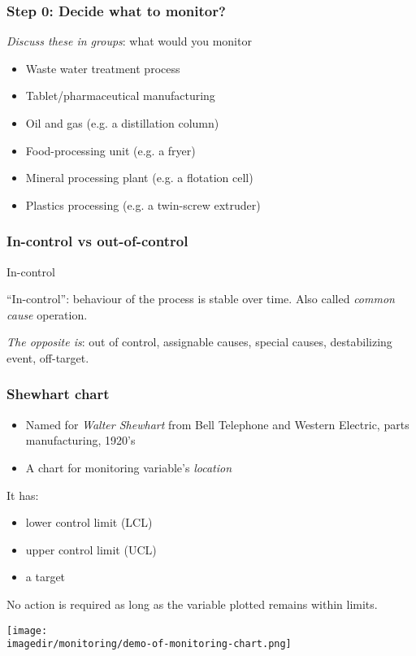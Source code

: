 \begin{frame}\frametitle{Step 0: Decide what to monitor?}
	
	\emph{Discuss these in groups}: what would you monitor 
	\begin{itemize}
		\item	Waste water treatment process 
		\item	Tablet/pharmaceutical manufacturing 
		\item	Oil and gas (e.g. a distillation column) 
		\item	Food-processing unit (e.g. a fryer) 
		\item	Mineral processing plant (e.g. a flotation cell) 
		\item	Plastics processing (e.g. a twin-screw extruder) 
	\end{itemize}
\end{frame}

\begin{frame}\frametitle{In-control vs out-of-control}
	\begin{block}
		{In-control} 
		\begin{center}
			``In-control'': behaviour of the process is stable over time. Also called \emph{common cause} operation. 
		\end{center}
	\end{block}
	
	\emph{The opposite is}: out of control, assignable causes, special causes, destabilizing event, off-target.
\end{frame}

\begin{frame}\frametitle{Shewhart chart}
	\begin{itemize}
		\item	Named for \emph{Walter Shewhart} from Bell Telephone and Western Electric, parts manufacturing, 1920's 
		\item	A chart for monitoring variable's \emph{location} 
	\end{itemize}
	
	It has: 
	\begin{itemize}
		\item	lower control limit (LCL) 
		\item	upper control limit (UCL) 
		\item	a target 
	\end{itemize}
	
	No action is required as long as the variable plotted remains within limits.
	
	\texttt{[image: \\imagedir/monitoring/demo-of-monitoring-chart.png]}
\end{frame}

